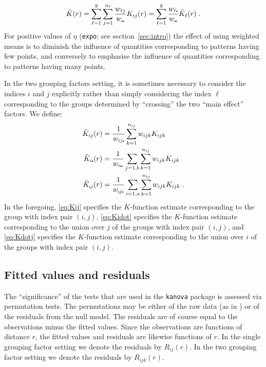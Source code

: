 \documentclass[12pt]{article}
\newcommand{\pullet}{\mbox{\scalebox{0.4}{$\bullet$}}}
\begin{document}
\[
\tilde{K}(r) = \sum_{\ell=1}^g \sum_{j=1}^{n_{\ell}}
             \frac{w_{\ell j}}{w_{\pullet \pullet}} K_{ij}(r)
= \sum_{\ell=1}^g \frac{w_{\ell \pullet}}{w_{\pullet \pullet}} \tilde{K}_\ell(r) \;.
\]
For positive values of $\eta$ (\texttt{expo}; see
section~\ref{sec:intro}) the effect of using weighted means is
to diminish the influence of quantities corresponding to patterns
having few points, and conversely to emphasise the influence of
quantities corresponding to patterns having many points.

In the two grouping factors setting, it is sometimes necessary
to consider the indices $i$ and $j$ explicitly rather than simply
considering the index $\ell$ corresponding to the groups determined
by ``crossing'' the two ``main effect'' factors.  We define:
\begin{align}
\tilde{K}_{ij}(r)        &= \frac{1}{w_{ij \pullet}} \label{eq:Kij}
                            \sum_{k=1}^{n_{ij}} w_{ijk} K_{ijk} \\
\tilde{K}_{i\pullet}(r)  &= \frac{1}{w_{i \pullet \pullet}} \label{eq:Kidot}
                            \sum_{j=1,b} \sum_{k=1}^{n_{ij}} w_{ijk} K_{ijk} \\
\tilde{K}_{\pullet j}(r) &= \frac{1}{w_{\pullet j \pullet}} \label{eq:Kdotj}
                            \sum_{i=1,a} \sum_{k=1}^{n_{ij}} w_{ijk} K_{ijk} \;.
\end{align}
In the foregoing, \eqref{eq:Kij} specifies the $K$-function estimate
corresponding to the group with index pair $(i,j)$, \eqref{eq:Kidot}
specifies the $K$-function estimate corresponding to the union over
$j$ of the groups with index pair $(i,j)$, and \eqref{eq:Kdotj}
specifies the $K$-function estimate corresponding to the union over
$i$ of the groups with index pair $(i,j)$.

\subsection{Fitted values and residuals}
\label{sec:fitres}

The ``significance'' of the tests that are used in the
\texttt{kanova} package is assessed via permutation tests.  The
permutations may be either of the raw data (as in \citealt{Hahn2012})
or of the residuals from the null model.  The residuals are of
course equal to the observations minus the fitted values.  Since the
observations are functions of distance $r$, the fitted values and
residuals are likewise functions of $r$.  In the single grouping
factor setting we denote the residuals by $R_{ij}(r)$.  In the two
grouping factor setting we denote the residuals by $R_{ijk}(r)$.
\end{document}
